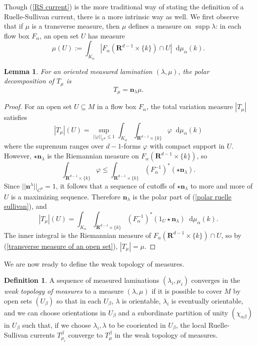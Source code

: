 \documentclass[reqno,10pt]{amsart}
\newcommand{\RR}{\mathbf{R}}
\newcommand*\dif{\mathop{}\!\mathrm{d}}
\DeclareMathOperator{\supp}{supp}
\newcommand{\normal}{\mathbf n}
\newcommand{\dfn}[1]{\emph{#1}\index{#1}}
\newtheorem{lemma}[theorem]{Lemma}
\theoremstyle{definition}
\newtheorem{definition}[theorem]{Definition}
\numberwithin{equation}{section}
\begin{document}
Though (\ref{RS current}) is the more traditional way of stating the definition of a Ruelle-Sullivan current, there is a more intrinsic way as well.
We first observe that if $\mu$ is a transverse measure, then $\mu$ defines a measure on $\supp \lambda$: in each flow box $F_\alpha$, an open set $U$ has measure
\begin{equation}\label{transverse measure of an open set}
\mu(U) := \int_{K_\alpha} |F_\alpha(\RR^{d - 1} \times \{k\}) \cap U| \dif \mu_\alpha(k).
\end{equation}

\begin{lemma}
For an oriented measured lamination $(\lambda, \mu)$, the polar decomposition of $T_\mu$ is
\begin{equation}\label{polar ruelle sullivan}
T_\mu = \normal_\lambda \mu.
\end{equation}
\end{lemma}
\begin{proof}
For an open set $U \subseteq M$ in a flow box $F_\alpha$, the total variation measure $|T_\mu|$ satisfies
$$|T_\mu|(U) = \sup_{||\varphi||_{C^0} \leq 1} \int_{K_\alpha} \int_{\RR^{d - 1} \times \{k\}} \varphi \dif \mu_\alpha(k)$$
where the supremum ranges over $d-1$-forms $\varphi$ with compact support in $U$.
However, $\star \normal_\lambda$ is the Riemannian measure on $F_\alpha(\RR^{d - 1} \times \{k\})$, so
$$\int_{\RR^{d - 1} \times \{k\}} \varphi \leq \int_{\RR^{d - 1} \times \{k\}} (F_\alpha^{-1})^*(\star \normal_\lambda).$$
Since $||\normal^\lambda||_{C^0} = 1$, it follows that a sequence of cutoffs of $\star \normal_\lambda$ to more and more of $U$ is a maximizing sequence.
Therefore $\normal_\lambda$ is the polar part of (\ref{polar ruelle sullivan}), and
$$|T_\mu|(U) = \int_{K_\alpha} \int_{\RR^{d - 1} \times \{k\}} (F_\alpha^{-1})^*(1_U \star \normal_\lambda) \dif \mu_\alpha(k).$$
The inner integral is the Riemannian measure of $F_\alpha(\RR^{d - 1} \times \{k\}) \cap U$, so by (\ref{transverse measure of an open set}), $|T_\mu| = \mu$.
\end{proof}

We are now ready to define the weak topology of measures.

\begin{definition}
A sequence of measured laminations $(\lambda_i, \mu_i)$ converges in the \dfn{weak topology of measures} to a measure $(\lambda, \mu)$ if it is possible to cover $M$ by open sets $(U_\beta)$ so that in each $U_\beta$, $\lambda$ is orientable, $\lambda_i$ is eventually orientable, and we can choose orientations in $U_\beta$ and a subordinate partition of unity $(\chi_{\alpha \beta})$ in $U_\beta$ such that, if we choose $\lambda_i, \lambda$ to be cooriented in $U_\beta$, the local Ruelle-Sullivan currents $T_{\mu_i}^\beta$ converge to $T_\mu^\beta$ in the weak topology of measures.
\end{definition}
\end{document}
